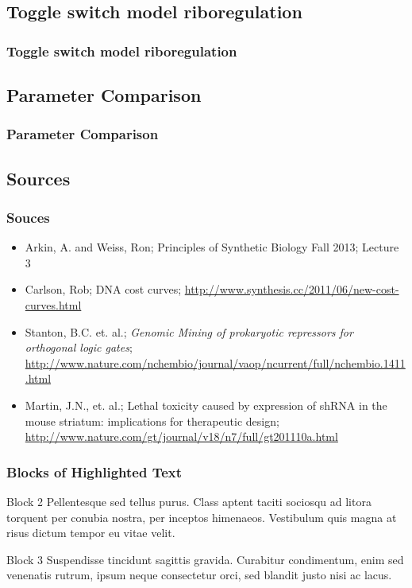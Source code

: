 \documentclass{beamer}
\begin{document}

\subsection{Toggle switch model riboregulation}
\begin{frame}
\frametitle{Toggle switch model riboregulation}
\end{frame}


\subsection{Parameter Comparison}
\begin{frame}
\frametitle{Parameter Comparison}
\end{frame}



\subsection{Sources}
\begin{frame}
\frametitle{Souces}

\begin{itemize}
\item Arkin, A. and Weiss, Ron; Principles of Synthetic Biology Fall 2013; Lecture 3
\item Carlson, Rob; DNA cost curves; \url{http://www.synthesis.cc/2011/06/new-cost-curves.html}
\item Stanton, B.C. et. al.; \emph{Genomic Mining of prokaryotic repressors for orthogonal logic gates};
  \url{http://www.nature.com/nchembio/journal/vaop/ncurrent/full/nchembio.1411.html}
\item Martin, J.N., et. al.; Lethal toxicity caused by expression of shRNA in the mouse striatum: implications for therapeutic design;
  \url{http://www.nature.com/gt/journal/v18/n7/full/gt201110a.html}
\end{itemize}
\end{frame}

\begin{frame}
\frametitle{Blocks of Highlighted Text}


\begin{block}{Block 2}
Pellentesque sed tellus purus. Class aptent taciti sociosqu ad litora torquent per conubia nostra, per inceptos himenaeos. Vestibulum quis magna at risus dictum tempor eu vitae velit.
\end{block}

\begin{block}{Block 3}
Suspendisse tincidunt sagittis gravida. Curabitur condimentum, enim sed venenatis rutrum, ipsum neque consectetur orci, sed blandit justo nisi ac lacus.
\end{block}
\end{frame}
\end{document}

